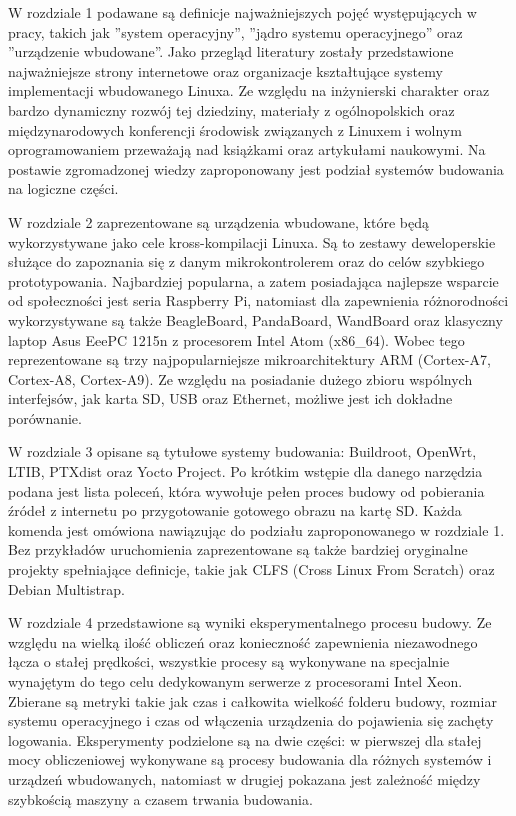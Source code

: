 \documentclass[printmode]{mgr}
\begin{document}
W rozdziale 1 podawane są definicje najważniejszych pojęć występujących w pracy, takich jak ''system operacyjny'', ''jądro systemu operacyjnego'' oraz ''urządzenie wbudowane''.
Jako przegląd literatury zostały przedstawione najważniejsze strony internetowe oraz organizacje kształtujące systemy implementacji wbudowanego Linuxa.
Ze względu na inżynierski charakter oraz bardzo dynamiczny rozwój tej dziedziny, materiały z ogólnopolskich oraz międzynarodowych konferencji środowisk związanych z Linuxem i wolnym oprogramowaniem przeważają nad książkami oraz artykułami naukowymi.
Na postawie zgromadzonej wiedzy zaproponowany jest podział systemów budowania na logiczne części.

W rozdziale 2 zaprezentowane są urządzenia wbudowane, które będą wykorzystywane jako cele kross-kompilacji Linuxa.
Są to zestawy deweloperskie służące do zapoznania się z danym mikrokontrolerem oraz do celów szybkiego prototypowania.
Najbardziej popularna, a zatem posiadająca najlepsze wsparcie od społeczności jest seria Raspberry Pi, natomiast dla zapewnienia różnorodności wykorzystywane są także BeagleBoard, PandaBoard, WandBoard oraz klasyczny laptop Asus EeePC 1215n z procesorem Intel Atom (x86\_64).
Wobec tego reprezentowane są trzy najpopularniejsze mikroarchitektury ARM (Cortex-A7, Cortex-A8, Cortex-A9).
Ze względu na posiadanie dużego zbioru wspólnych interfejsów, jak karta SD, USB oraz Ethernet, możliwe jest ich dokładne porównanie.

W rozdziale 3 opisane są tytułowe systemy budowania: Buildroot, OpenWrt, LTIB, PTXdist oraz Yocto Project.
Po krótkim wstępie dla danego narzędzia podana jest lista poleceń, która wywołuje pełen proces budowy od pobierania źródeł z internetu po przygotowanie gotowego obrazu na kartę SD.
Każda komenda jest omówiona nawiązując do podziału zaproponowanego w rozdziale 1.
Bez przykładów uruchomienia zaprezentowane są także bardziej oryginalne projekty spełniające definicje, takie jak CLFS (Cross Linux From Scratch) oraz Debian Multistrap.

W rozdziale 4 przedstawione są wyniki eksperymentalnego procesu budowy.
Ze względu na wielką ilość obliczeń oraz konieczność zapewnienia niezawodnego łącza o stałej prędkości, wszystkie procesy są wykonywane na specjalnie wynajętym do tego celu dedykowanym serwerze z procesorami Intel Xeon.
Zbierane są metryki takie jak czas i całkowita wielkość folderu budowy, rozmiar systemu operacyjnego i czas od włączenia urządzenia do pojawienia się zachęty logowania.
Eksperymenty podzielone są na dwie części: w pierwszej dla stałej mocy obliczeniowej wykonywane są procesy budowania dla różnych systemów i urządzeń wbudowanych, natomiast w drugiej pokazana jest zależność między szybkością maszyny a czasem trwania budowania.
\end{document}
